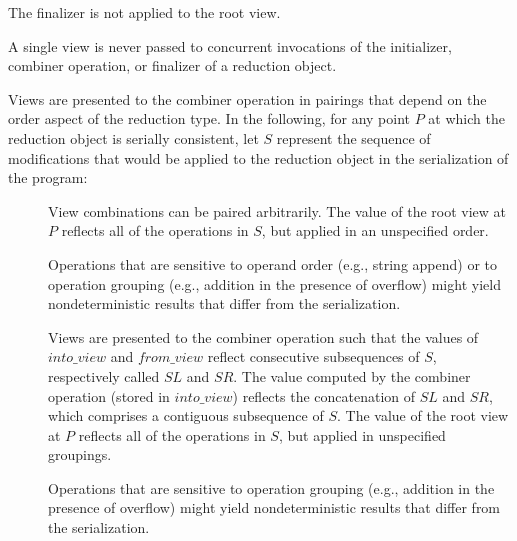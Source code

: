 The finalizer is not applied to the root view.

\begin{note}
A single view is never passed to concurrent invocations
of the initializer, combiner operation, or finalizer
of a reduction object.
\end{note}

\pnum
Views are presented to the combiner operation in pairings
that depend on the order aspect of the reduction type.
In the following,
for any point
$P$
at which the reduction object is serially consistent,
let
$S$
represent the sequence of modifications
that would be applied to the reduction object
in the serialization of the program:

\begin{description}
\item[]

View combinations can be paired arbitrarily.
The value of the root view at
$P$
reflects all of the operations in
$S$,
but applied in an unspecified order.

\begin{note}
Operations that are sensitive to operand order
(e.g., string append)
or to operation grouping
(e.g., addition in the presence of overflow)
might yield nondeterministic results that differ from the serialization.
\end{note}

\item[]

Views are presented to the combiner operation
such that the values of
$into\_view$
and
$from\_view$
reflect consecutive subsequences of
$S$,
respectively called
$SL$ and $SR$.
The value computed by the combiner operation
(stored in
$into\_view$)
reflects the concatenation of
$SL$ and $SR$,
which comprises a contiguous subsequence of
$S$.
The value of the root view at
$P$
reflects all of the operations in
$S$,
but applied in unspecified groupings.

\begin{note}
Operations that are sensitive to operation grouping
(e.g., addition in the presence of overflow)
might yield nondeterministic results that differ from the serialization. 
\end{note}

\begin{comment}
\item[\tcode{\removed{_Serial}}]
\footnote{TODO:
Neither Cilk nor OpenMP provides this sort of guarantee.
Should CPLEX include it?
}
Views are presented to the combiner operation
such that the value of
$into\_view$
is the partial result reflecting an initial subsequence of
$S$,
called
$SL$,
and the value of
$from\_view$
is the partial result reflecting the next
(single) consecutive operation in
$S$
following
$SL$.
Thus, modifications are made to a single view
(ultimately the root view)
in the same order as for the serialization.


\end{comment}
\end{description}
